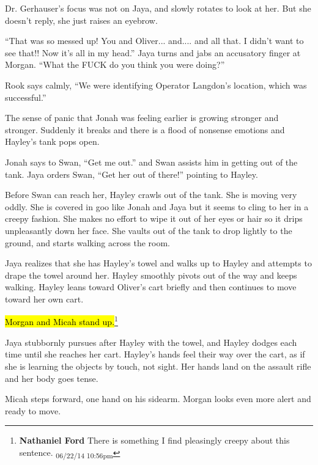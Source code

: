 Dr. Gerhauser's focus was not on Jaya, and slowly rotates to look at her. But she doesn't reply, she just raises an eyebrow.

``That was so messed up!  You and Oliver... and.... and all that.  I didn't want to see that!!  Now it's all in my head.''  Jaya turns and jabs an accusatory finger at Morgan.   ``What the FUCK do you think you were doing?''



Rook says calmly, ``We were identifying Operator Langdon's location, which was successful.''



The sense of panic that Jonah was feeling earlier is growing stronger and stronger.  Suddenly it breaks and there is a flood of nonsense emotions and Hayley's tank pops open.



Jonah says to Swan, ``Get me out.'' and Swan assists him in getting out of the tank.  Jaya orders Swan, ``Get her out of there!'' pointing to Hayley.



Before Swan can reach her, Hayley crawls out of the tank.  She is moving very oddly.  She is covered in goo like Jonah and Jaya but it seems to cling to her in a creepy fashion.  She makes no effort to wipe it out of her eyes or hair so it drips unpleasantly down her face.  She vaults out of the tank to drop lightly to the ground, and starts walking across the room.



Jaya realizes that she has Hayley's towel and walks up to Hayley and attempts to drape the towel around her.  Hayley smoothly pivots out of the way and keeps walking.  Hayley leans toward Oliver's cart briefly and then continues to move toward her own cart.



\hl{Morgan and Micah stand up.}\footnote{\textbf{Nathaniel Ford }There is something I find pleasingly creepy about this sentence. \textsubscript{06/22/14 10:56pm}}  



Jaya stubbornly pursues after Hayley with the towel, and Hayley dodges each time until she reaches her cart.  Hayley's hands feel their way over the cart, as if she is learning the objects by touch, not sight.  Her hands land on the assault rifle and her body goes tense.



Micah steps forward, one hand on his sidearm.  Morgan looks even more alert and ready to move.



